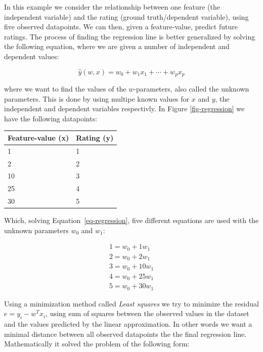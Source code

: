 In this example we consider the relationship between one feature (the
independent variable) and the rating (ground truth/dependent variable), using
five observed datapoints. We can then, given a feature-value, predict future
ratings. The process of finding the regression line is better generalized by
solving the following equation, where we are given a number of independent and
dependent values:

\begin{equation}
  \label{eq-regression}
  \hat{y}(w,x) = w_0 + w_1 x_1 + \cdots + w_p x_p
\end{equation}

where we want to find the values of the $w$-parameters, also called the unknown
parameters. This is done by using multipe known values for $x$ and $y$, the
independent and dependent variables respectivly. In Figure \ref{fig-regression}
we have the following datapoints:

\begin{table}[H]
  \centering
  \begin{tabular}{ll}
  \toprule
  Feature-value (x) & Rating (y) \\
  \midrule
   1 & 1 \\
   2  & 2 \\
   10  & 3 \\
   25 & 4 \\
   30  & 5 \\
   \bottomrule
  \end{tabular}
\end{table}

Which, solving Equation~\ref{eq-regression}, five different equations are
used with the unknown parameters $w_0$ and $w_1$:

\begin{equation}
  \label{eqs-regression-example}
  \begin{split}
    1 = w_0 + 1 w_1 \\
    2 = w_0 + 2 w_1 \\
    3 = w_0 + 10 w_1 \\
    4 = w_0 + 25 w_1 \\
    5 = w_0 + 30 w_1
  \end{split}
\end{equation}

Using a minimization method called \textit{Least squares} we try to minimize
the residual $e = y_i - w^{T}x_{i}$, using sum of squares between the observed
values in the dataset and the values predicted by the linear approximation. In
other words we want a minimal distance between all observed datapoints the the
final regression line. Mathematically it solved the problem of the following
form:

